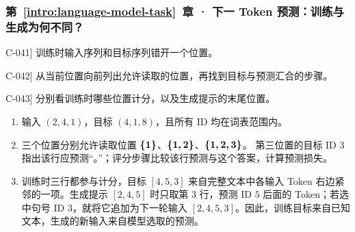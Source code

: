 \subsubsection*{第~\ref*{intro:language-model-task}~章 · 下一 Token 预测：训练与生成为何不同？}
\begin{answerhints}
\item[\hyperref[exercise:shifted-token-targets]{C-041}] \leavevmode{}\label{hint:shifted-token-targets}训练时输入序列和目标序列错开一个位置。
\item[\hyperref[exercise:causal-target-visibility]{C-042}] \leavevmode{}\label{hint:causal-target-visibility}从当前位置向前列出允许读取的位置，再找到目标与预测汇合的步骤。
\item[\hyperref[exercise:training-generation-data]{C-043}] \leavevmode{}\label{hint:training-generation-data}分别看训练时哪些位置计分，以及生成提示的末尾位置。
\end{answerhints}
\begin{enumerate}[label={},leftmargin=4.8em,itemsep=4pt]
\item[\textbf{\hyperref[exercise:shifted-token-targets]{C-041.}}] \leavevmode{}\label{solution:C-041}\label{solution:shifted-token-targets}输入 $(2,4,1)$，目标 $(4,1,8)$，且所有 ID 均在词表范围内。
\item[\textbf{\hyperref[exercise:causal-target-visibility]{C-042.}}] \leavevmode{}\label{solution:C-042}\label{solution:causal-target-visibility}三个位置分别允许读取位置 $\boldsymbol{\{1\}}$、$\boldsymbol{\{1,2\}}$、$\boldsymbol{\{1,2,3\}}$。
第三位置的目标 ID $3$ 指出该行应预测“。”；评分步骤比较该行预测与这个答案，计算预测损失。
\item[\textbf{\hyperref[exercise:training-generation-data]{C-043.}}] \leavevmode{}\label{solution:C-043}\label{solution:training-generation-data}训练时三行都参与计分，目标 $[4,5,3]$ 来自完整文本中各输入 Token 右边紧邻的一项。生成提示 $[2,4,5]$ 时只取第 $3$ 行，预测 ID $5$ 后面的 Token；若选中句号 ID $3$，就将它追加为下一轮输入 $[2,4,5,3]$。因此，训练目标来自已知文本，生成的新输入来自模型选取的预测。
\end{enumerate}
